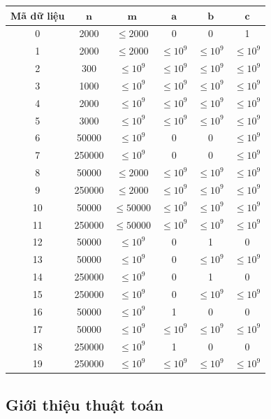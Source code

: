 \documentclass[11pt]{article}
\begin{document}
\begin{center}
\small
\begin{tabular}{|c|c|c|c|c|c|}
\hline
\textbf{Mã dữ liệu} & \(\boldsymbol n\) & \(\boldsymbol m\) &
\(\boldsymbol a\) & \(\boldsymbol b\) & \(\boldsymbol c\) \\
\hline
0 & 2000 & \(\le 2000\) & 0 & 0 & 1 \\
1 & 2000 & \(\le 2000\) & \(\le 10^9\) & \(\le 10^9\) & \(\le 10^9\) \\
2 & 300 & \(\le 10^9\) & \(\le 10^9\) & \(\le 10^9\) & \(\le 10^9\) \\
3 & 1000 & \(\le 10^9\) & \(\le 10^9\) & \(\le 10^9\) & \(\le 10^9\) \\
4 & 2000 & \(\le 10^9\) & \(\le 10^9\) & \(\le 10^9\) & \(\le 10^9\) \\
5 & 3000 & \(\le 10^9\) & \(\le 10^9\) & \(\le 10^9\) & \(\le 10^9\) \\
6 & 50000 & \(\le 10^9\) & 0 & 0 & \(\le 10^9\) \\
7 & 250000 & \(\le 10^9\) & 0 & 0 & \(\le 10^9\) \\
8 & 50000 & \(\le 2000\) & \(\le 10^9\) & \(\le 10^9\) & \(\le 10^9\) \\
9 & 250000 & \(\le 2000\) & \(\le 10^9\) & \(\le 10^9\) & \(\le 10^9\) \\
10 & 50000 & \(\le 50000\) & \(\le 10^9\) & \(\le 10^9\) & \(\le 10^9\) \\
11 & 250000 & \(\le 50000\) & \(\le 10^9\) & \(\le 10^9\) & \(\le 10^9\) \\
12 & 50000 & \(\le 10^9\) & 0 & 1 & 0 \\
13 & 50000 & \(\le 10^9\) & 0 & \(\le 10^9\) & \(\le 10^9\) \\
14 & 250000 & \(\le 10^9\) & 0 & 1 & 0 \\
15 & 250000 & \(\le 10^9\) & 0 & \(\le 10^9\) & \(\le 10^9\) \\
16 & 50000 & \(\le 10^9\) & 1 & 0 & 0 \\
17 & 50000 & \(\le 10^9\) & \(\le 10^9\) & \(\le 10^9\) & \(\le 10^9\) \\
18 & 250000 & \(\le 10^9\) & 1 & 0 & 0 \\
19 & 250000 & \(\le 10^9\) & \(\le 10^9\) & \(\le 10^9\) & \(\le 10^9\) \\
\hline
\end{tabular}
\end{center}

\subsection{Giới thiệu thuật toán}
\end{document}
